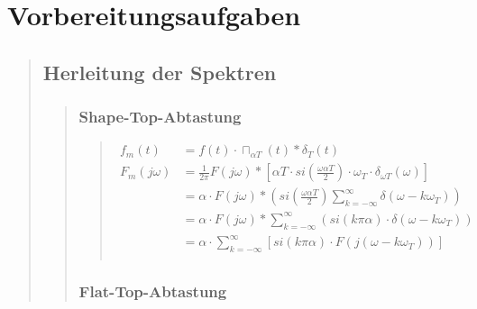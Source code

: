\section{Vorbereitungsaufgaben}
\begin{quote}
    \hspace{-2em}
    \subsection{Herleitung der Spektren}
    \begin{quote}
        
        \subsubsection{Shape-Top-Abtastung}
        \begin{quote}
            
            
            \begin{equation*}
                \begin{split}
                    f_m (t)   &= f(t) \cdot \sqcap_{\alpha T} (t) \ast \delta_T (t) \\
                    F_m (j\omega) &= \frac{1}{2\pi} F (j\omega) \ast \left [ \alpha T \cdot si \left( \frac{\omega
                    \alpha T}{2} \right) \cdot \omega_T \cdot \delta_{\omega T} (\omega) \right] \\
                    &= \alpha \cdot F (j \omega) \ast \left ( si \left( \frac{\omega \alpha T}{2} \right)
                    \sum_{k=-\infty}^{\infty} \delta (\omega - k\omega_T) \right)\\
                    &= \alpha \cdot F (j \omega) \ast \sum_{k=-\infty}^{\infty} (si(k \pi \alpha) \cdot \delta (\omega -
                    k\omega_T))\\
                    &= \alpha \cdot \sum_{k=-\infty}^{\infty} \left [ si(k \pi \alpha) \cdot F (j(\omega - k\omega_T))
                    \right]\\
                \end{split}
            \end{equation*}
            
            
        \end{quote}
        
        \subsubsection{Flat-Top-Abtastung}
        \begin{quote}
            

\end{quote}
\end{quote}
\end{quote}
